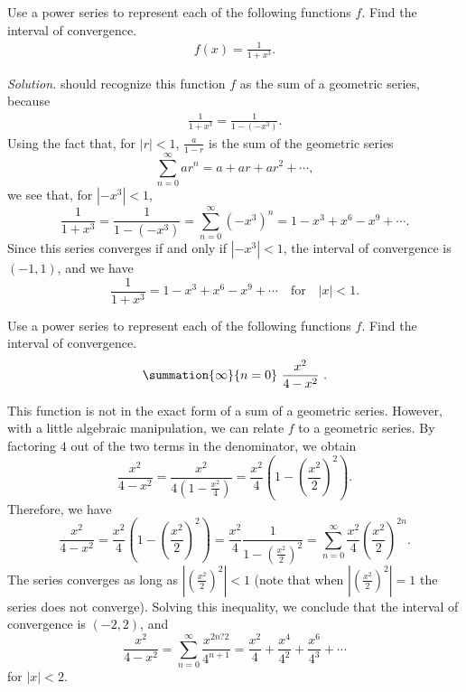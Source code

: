 \documentclass{report}
\begin{document}
    \bigbreak \noindent 
    \begin{exm}
       Use a power series to represent each of the following functions  $f$. Find the interval of convergence. 
       \begin{align*}
           f(x) = \frac{1}{1+x^{3}}
       .\end{align*}
    \end{exm}
    \bigbreak \noindent 
    \textit{Solution.} should recognize this function $f$ as the sum of a geometric series, because
    \begin{align*}
        \frac{1}{1+x^{3}} = \frac{1}{1-(-x^{3})}
    .\end{align*}
    Using the fact that, for \( |r| < 1 \), \(\frac{a}{1 - r}\) is the sum of the geometric series
\[
    \sum_{n=0}^{\infty} ar^n = a + ar + ar^2 + \cdots,
\]
we see that, for \( \left| -x^3 \right| < 1 \),
\[
    \frac{1}{1 + x^3} = \frac{1}{1 - (-x^3)} = \sum_{n=0}^{\infty} (-x^3)^n = 1 - x^3 + x^6 - x^9 + \cdots.
\]
Since this series converges if and only if \( \left| -x^3 \right| < 1 \), the interval of convergence is \( (-1, 1) \), and we have
\[
    \frac{1}{1 + x^3} = 1 - x^3 + x^6 - x^9 + \cdots \quad \text{for} \quad |x| < 1.
\]


    \pagebreak \bigbreak \noindent 
    \begin{exm}
       Use a power series to represent each of the following functions  $f$. Find the interval of convergence. 
       \begin{align*}
           \summation{\infty}{n=0}\ \frac{x^{2}}{4-x^{2}}\ 
       .\end{align*}
    \end{exm}
    \bigbreak \noindent 
    This function is not in the exact form of a sum of a geometric series. However, with a little algebraic manipulation, we can relate \( f \) to a geometric series. By factoring \( 4 \) out of the two terms in the denominator, we obtain
    \[
        \frac{x^2}{4 - x^2} = \frac{x^2}{4(1 - \frac{x^2}{4})} = \frac{x^2}{4}\left(1 - \left(\frac{x^2}{2}\right)^2\right).
    \]
    \bigbreak \noindent 
    Therefore, we have
    \[
        \frac{x^2}{4 - x^2} = \frac{x^2}{4}\left(1 - \left(\frac{x^2}{2}\right)^2\right) = \frac{x^2}{4}\frac{1}{1 - \left(\frac{x^2}{2}\right)^2} = \sum_{n=0}^{\infty} \frac{x^2}{4}\left(\frac{x^2}{2}\right)^{2n}.
    \]
    \bigbreak \noindent 
    The series converges as long as \( \left|\left(\frac{x^2}{2}\right)^2\right| < 1 \) (note that when \( \left|\left(\frac{x^2}{2}\right)^2\right| = 1 \) the series does not converge). Solving this inequality, we conclude that the interval of convergence is \( (-2, 2) \), and
    \[
        \frac{x^2}{4 - x^2} = \sum_{n=0}^{\infty} \frac{x^{2n?2}}{4^{n+1}} = \frac{x^2}{4} + \frac{x^4}{4^2} + \frac{x^6}{4^3} + \cdots
    \]
    \bigbreak \noindent 
    for \( |x| < 2 \).
\end{document}
